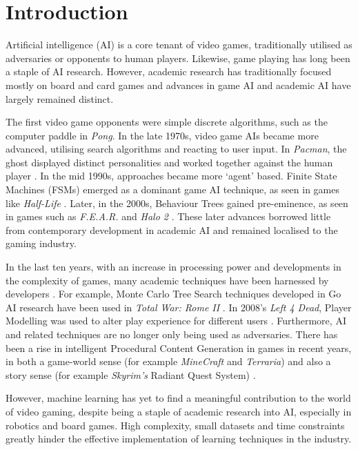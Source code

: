 

\section{Introduction}

Artificial intelligence (AI) is a core tenant of video games, traditionally utilised as adversaries or opponents to human players. Likewise, game playing has long been a staple of AI research. However, academic research has traditionally focused mostly on board and card games and advances in game AI and academic AI have largely remained distinct.

The first video game opponents were simple discrete algorithms, such as the computer paddle in \emph{Pong}. In the late 1970s, video game AIs became more advanced, utilising search algorithms and reacting to user input. In \emph{Pacman}, the ghost displayed distinct personalities and worked together against the human player \cite{pacmanghosts}. In the mid 1990s, approaches became more `agent' based. Finite State Machines (FSMs) emerged as a dominant game AI technique, as seen in games like \emph{Half-Life} \cite{halflife}. Later, in the 2000s, Behaviour Trees gained pre-eminence, as seen in games such as \emph{F.E.A.R.} \cite{fear} and \emph{Halo 2} \cite{halo}. These later advances borrowed little from contemporary development in academic AI and remained localised to the gaming industry.

In the last ten years, with an increase in processing power and developments in the complexity of games, many academic techniques have been harnessed by developers \cite{myangelcafe}. For example, Monte Carlo Tree Search techniques developed in Go AI research have been used in \emph{Total War: Rome II} \cite{rome}. In 2008's \emph{Left 4 Dead}, Player Modelling was used to alter play experience for different users \cite[p.~10]{playermod}. Furthermore, AI and related techniques are no longer only being used as adversaries. There has been a rise in intelligent Procedural Content Generation in games in recent years, in both a game-world sense (for example \emph{MineCraft} and \emph{Terraria}) and also a story sense (for example \emph{Skyrim's} Radiant Quest System) \cite{skyrim}.

However, machine learning has yet to find a meaningful contribution to the world of video gaming, despite being a staple of academic research into AI, especially in robotics and board games. High complexity, small datasets and time constraints greatly hinder the effective implementation of learning techniques in the industry.

